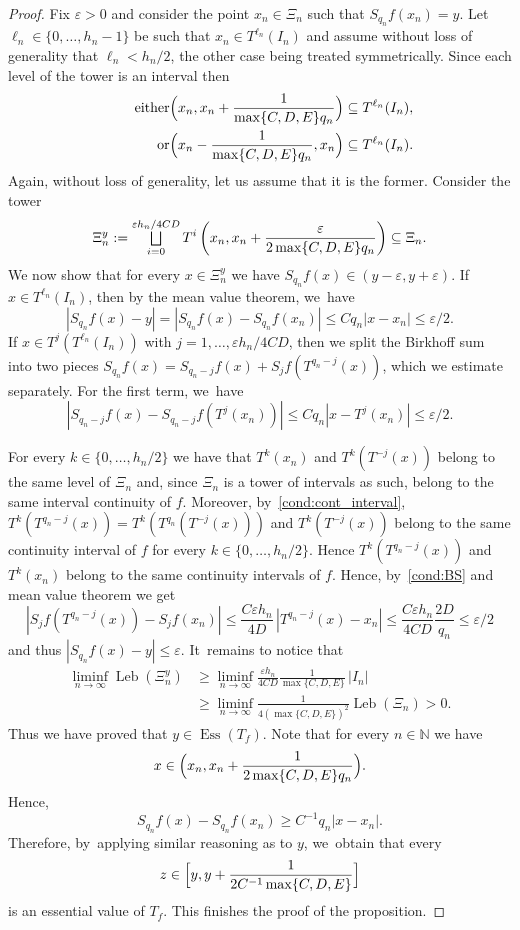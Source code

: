 \documentclass[JEP,XML,SOM,Unicode,NoEqCountersInSection,NoFloatCountersInSection,published]{cedram}
\let\oldbigsqcup\bigsqcup
\renewcommand{\bigsqcup}{\mathop{\textstyle\oldbigsqcup}\displaylimits}
\let\epsilon\varepsilon
\DeclareMathOperator{\Ess}{Ess}
\DeclareMathOperator{\Leb}{Leb}
\theoremstyle{plain}
\theoremstyle{definition}
\newcommand{\N}{\mathbb{N}}
\begin{document}
\begin{proof}
Fix $\epsilon>0$ and consider the point {$x_n \in \Xi_n$ such that $S_{q_n}f(x_n)=y$}.
Let $\ell_n\in\{0,\ldots,h_n-1\}$ be such that $x_n\in T^{\ell_n}(I_n)$ and assume without loss of generality that $\ell_n<h_{n}/2$, the other case being treated symmetrically. Since each level of the tower is an interval then
\begin{align*}
\tag*{either}
\Bigl(x_n,x_n+\frac{1}{\max\{C, D,E\} q_n}\Bigr)\subseteq T^{\ell_n}(I_n),\\
\tag*{or} \Bigl(x_n-\frac{1}{\max\{C,D,E\} q_n},x_n\Bigr)\subseteq T^{\ell_n}(I_n).
\end{align*}
Again, without loss of generality, let us assume that it is the former. Consider the tower
\[
\Xi_n^y:=\bigsqcup_{i=0}^{\epsilon h_n/4CD} T^i\left(x_n,x_n+\frac{\epsilon}{2\max\{C,D,E\} q_n}\right)\subseteq \Xi_n.
\]
We now show that for every $x\in \Xi_n^y$ we have $S_{q_n}f(x)\in(y-\epsilon,y+\epsilon)$. If $x\in T^{\ell_n}(I_n)$, then by the mean value theorem, we~have
\[
\left|S_{q_n}f(x)-y\right|=\left|S_{q_n}f(x)-S_{q_n}f(x_n)\right|\le Cq_n|x-x_n|\le \epsilon/2.
\]
If $x\in T^{j} (T^{\ell_n}(I_n))$ with $j=1,\ldots,\epsilon h_n/4CD$, then we
split the Birkhoff sum into two pieces $S_{q_n}f(x) = S_{q_n - j}f (x) +
S_jf(T^{q_n - j}(x))$, which we estimate separately. For the first term, we~have
\[
\left|S_{q_n-j} f(x)-S_{q_n-j} f(T^j(x_n))\right|\le Cq_n|x-T^j(x_n)|\le\epsilon/2.
\]

For every $k\in\{0,\ldots,h_n/2\}$ we have that $T^{k}(x_n)$ and
$T^{k}(T^{-j}(x))$ belong to the same level of $\Xi_n$ and, since $\Xi_n$ is a
tower of intervals as such, belong to the same interval continuity of $f$.
Moreover, by~\eqref{cond:cont_interval}, $T^k(T^{q_n-j}(x))=T^k(T^{q_n}(T^{-j}(x)))$ and
$T^{k}(T^{-j}(x))$ belong to the same
continuity interval of $f$ for every $k\in\{0,\ldots,h_n/2\}$. Hence
$T^k(T^{q_n-j}(x))$ and $T^k(x_n)$ belong to the same continuity intervals of
$f$. Hence, by~\eqref{cond:BS} and mean value theorem we
get
\[
\left|S_j f(T^{q_n-j}(x))-S_j f(x_n)\right|\le \frac{C\epsilon h_n}{4D}\,|T^{q_n-j}(x)-x_n|\le \frac{C\epsilon h_n}{4CD} \frac{2D}{q_n}\le\epsilon/2
\]
and thus $|S_{q_n} f(x)-y|\le \epsilon$. It~remains to notice that
\begin{align*}
\liminf_{n\to\infty}\Leb(\Xi_n^y)&\ge \liminf_{n\to\infty}\frac{\epsilon h_n}{4CD}\frac{1}{\max\{C,D,E\}}\,|I_n|\\
&\ge \liminf_{n\to\infty} \frac{1}{4(\max\{C,D,E\})^2}\Leb(\Xi_n)>0.
\end{align*}
Thus we have proved that $y\in \Ess(T_f)$. Note that for every $n\in\N$ {we have}
\[
x\in \Bigl(x_n,x_n+\frac{1}{2\max\{C,D,E\} q_n}\Bigr).
\]
Hence,
\[
S_{q_n}f(x)-S_{q_n}f(x_n)\ge C^{-1}q_n |x-x_n|.
\]
Therefore, by~applying similar reasoning as to $y$, we~obtain that every
\[
z\in\Bigl[y,y+\frac{1}{2C^{-1}\max\{C,D,E\}}\Bigr]
\]
is an essential value of $T_f$. This finishes the proof of the proposition.
\end{proof}
\end{document}
